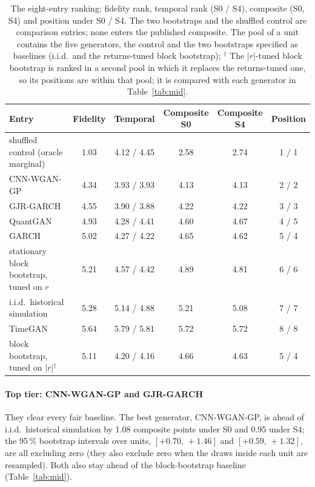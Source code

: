 \documentclass[11pt,a4paper]{article}
\makeatletter
\DeclareRobustCommand{\_}{\ifmmode\nfss@text{\textunderscore}\else\textunderscore\allowbreak\fi}
\makeatother
\begin{document}
\begin{table}[htbp]
\centering
\caption{The eight-entry ranking: fidelity rank, temporal rank (S0 / S4), composite (S0, S4) and position under S0 / S4. The two bootstraps and the shuffled control are comparison entries; none enters the published composite. The pool of a unit contains the five generators, the control and the two bootstraps specified as baselines (i.i.d.\ and the returns-tuned block bootstrap); $^\dagger$ The $|r|$-tuned block bootstrap is ranked in a second pool in which it replaces the returns-tuned one, so its positions are within that pool; it is compared with each generator in Table~\ref{tab:mid}.}
\label{tab:tiers}
\begin{tabular}{@{}lccccc@{}}
\toprule
Entry & Fidelity & Temporal & Composite S0 & Composite S4 & Position \\
\midrule
shuffled control (oracle marginal) & 1.03 & 4.12 / 4.45 & 2.58 & 2.74 & 1 / 1 \\
CNN-WGAN-GP & 4.34 & 3.93 / 3.93 & 4.13 & 4.13 & 2 / 2 \\
GJR-GARCH & 4.55 & 3.90 / 3.88 & 4.22 & 4.22 & 3 / 3 \\
QuantGAN & 4.93 & 4.28 / 4.41 & 4.60 & 4.67 & 4 / 5 \\
GARCH & 5.02 & 4.27 / 4.22 & 4.65 & 4.62 & 5 / 4 \\
stationary block bootstrap, tuned on $r$ & 5.21 & 4.57 / 4.42 & 4.89 & 4.81 & 6 / 6 \\
i.i.d.\ historical simulation & 5.28 & 5.14 / 4.88 & 5.21 & 5.08 & 7 / 7 \\
TimeGAN & 5.64 & 5.79 / 5.81 & 5.72 & 5.72 & 8 / 8 \\
block bootstrap, tuned on $|r|$$^\dagger$ & 5.11 & 4.20 / 4.16 & 4.66 & 4.63 & 5 / 4 \\
\bottomrule
\end{tabular}
\end{table}

\paragraph{Top tier: CNN-WGAN-GP and GJR-GARCH} They clear every fair baseline. The best generator, CNN-WGAN-GP, is ahead of i.i.d.\ historical simulation by 1.08 composite points under S0 and 0.95 under S4; the 95\,\% bootstrap intervals over units, $[+0.70,\,+1.46]$ and $[+0.59,\,+1.32]$, are all excluding zero (they also exclude zero when the draws inside each unit are resampled). Both also stay ahead of the block-bootstrap baseline (Table~\ref{tab:mid}).
\end{document}
